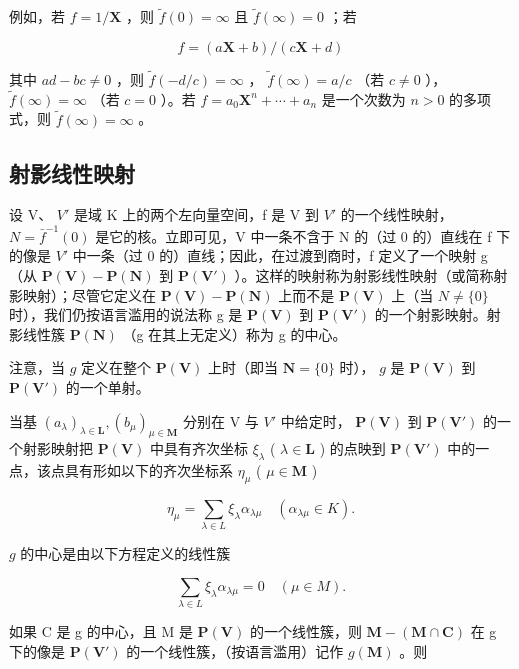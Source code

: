 例如，若 \(f = 1 / \mathbf{X}\) ，则 \(\tilde{f}(0) = \infty\) 且 \(\tilde{f}(\infty) = 0\) ；若

\[
f = (a \mathbf {X} + b) / (c \mathbf {X} + d)
\]

其中 \(ad - bc \neq 0\) ，则 \(\tilde{f}(-d/c) = \infty\) ， \(\tilde{f}(\infty) = a/c\) （若 \(c \neq 0\) ）， \(\tilde{f}(\infty) = \infty\) （若 \(c = 0\) ）。若 \(f = a_0\mathbf{X}^n + \cdots + a_n\) 是一个次数为 \(n > 0\) 的多项式，则 \(\tilde{f}(\infty) = \infty\) 。

\subsection{射影线性映射}

设 V、 \(V'\) 是域 K 上的两个左向量空间，f 是 V 到 \(V'\) 的一个线性映射， \(N = \bar{f}^{-1}(0)\) 是它的核。立即可见，V 中一条不含于 N 的（过 0 的）直线在 f 下的像是 \(V'\) 中一条（过 0 的）直线；因此，在过渡到商时，f 定义了一个映射 g （从 \(\mathbf{P}(\mathbf{V}) - \mathbf{P}(\mathbf{N})\) 到 \(\mathbf{P}(\mathbf{V}')\) ）。这样的映射称为射影线性映射（或简称射影映射）；尽管它定义在 \(\mathbf{P}(\mathbf{V}) - \mathbf{P}(\mathbf{N})\) 上而不是 \(\mathbf{P}(\mathbf{V})\) 上（当 \(N \neq \{0\}\) 时），我们仍按语言滥用的说法称 g 是 \(\mathbf{P}(\mathbf{V})\) 到 \(\mathbf{P}(\mathbf{V}')\) 的一个射影映射。射影线性簇 \(\mathbf{P}(\mathbf{N})\) （g 在其上无定义）称为 g 的中心。

注意，当 \(g\) 定义在整个 \(\mathbf{P}(\mathbf{V})\) 上时（即当 \(\mathbf{N} = \{0\}\) 时）， \(g\) 是 \(\mathbf{P}(\mathbf{V})\) 到 \(\mathbf{P}(\mathbf{V}')\) 的一个单射。

当基 \((a_{\lambda})_{\lambda\in\mathbf{L}}, (b_{\mu})_{\mu\in\mathbf{M}}\) 分别在 V 与 \(V'\) 中给定时， \(\mathbf{P}(\mathbf{V})\) 到 \(\mathbf{P}(\mathbf{V}')\) 的一个射影映射把 \(\mathbf{P}(\mathbf{V})\) 中具有齐次坐标 \(\xi_{\lambda}\) ( \(\lambda \in \mathbf{L}\) ) 的点映到 \(\mathbf{P}(\mathbf{V}')\) 中的一点，该点具有形如以下的齐次坐标系 \(\eta_{\mu}\) ( \(\mu \in \mathbf{M}\) )

\[
\eta_ {\mu} = \sum_ {\lambda \in L} \xi_ {\lambda} \alpha_ {\lambda \mu} \quad (\alpha_ {\lambda \mu} \in K).\tag{6}
\]

 \(g\) 的中心是由以下方程定义的线性簇

\[
\sum_ {\lambda \in L} \xi_ {\lambda} \alpha_ {\lambda \mu} = 0 \quad (\mu \in M).
\]

如果 C 是 g 的中心，且 M 是 \(\mathbf{P}(\mathbf{V})\) 的一个线性簇，则 \(\mathbf{M} - (\mathbf{M} \cap \mathbf{C})\) 在 g 下的像是 \(\mathbf{P}(\mathbf{V}')\) 的一个线性簇，（按语言滥用）记作 \(g(\mathbf{M})\) 。则

